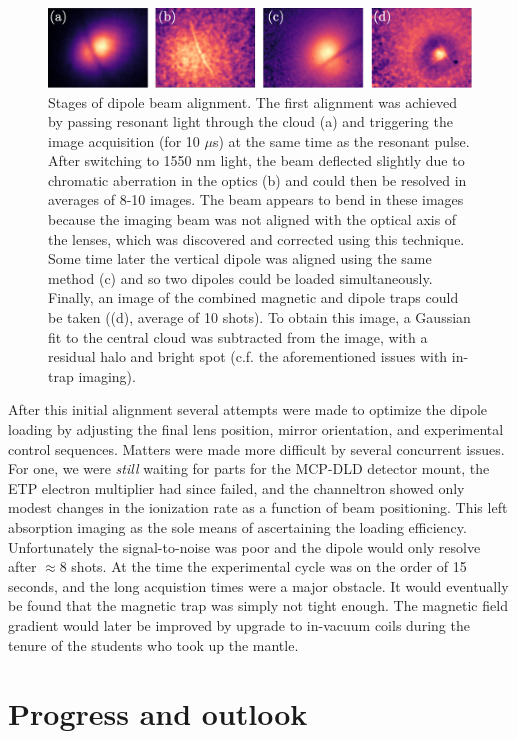 	\begin{figure}
	\centering
	\includegraphics[width=\textwidth]{fig/lattice/dipole_alignment_stages}
		\caption{Stages of dipole beam alignment.
	The first alignment was achieved by passing resonant light through the cloud (a) and triggering the image acquisition (for 10 $\mu$s) at the same time as the resonant pulse.
	After switching to 1550 nm light, the beam deflected slightly due to chromatic aberration in the optics (b) and could then be resolved in averages of 8-10 images. 
	The beam appears to bend in these images because the imaging beam was not aligned with the optical axis of the lenses, which was discovered and corrected using this technique.
	Some time later the vertical dipole was aligned using the same method (c) and so two dipoles could be loaded simultaneously. 
	Finally, an image of the combined magnetic and dipole traps could be taken ((d), average of 10 shots). To obtain this image, a Gaussian fit to the central cloud was subtracted from the image, with a residual halo and bright spot (c.f. the aforementioned issues with in-trap imaging).}
	\label{fig:dipole_align}
	\end{figure}

	After this initial alignment several attempts were made to optimize the dipole loading by adjusting the final lens position, mirror orientation, and experimental control sequences.	
	Matters were made more difficult by several concurrent issues.
	For one, we were \emph{still} waiting for parts for the MCP-DLD detector mount, the ETP electron multiplier had since failed, and the channeltron showed only modest changes in the ionization rate as a function of beam positioning.	
	This left absorption imaging as the sole means of ascertaining the loading efficiency.
	Unfortunately the signal-to-noise was poor and the dipole would only resolve after $\approx 8$ shots.
	At the time the experimental cycle was on the order of 15 seconds, and the long acquistion times were a major obstacle.
	It would eventually be found that the magnetic trap was simply not tight enough.
	The magnetic field gradient would later be improved by upgrade to in-vacuum coils during the tenure of the students who took up the mantle.
	

\section{Progress and outlook}
	


